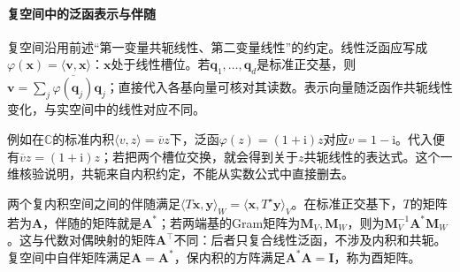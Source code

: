 \paragraph{复空间中的泛函表示与伴随}
复空间沿用前述“第一变量共轭线性、第二变量线性”的约定。线性泛函应写成$\varphi(\bm x)=\langle\bm v,\bm x\rangle$：$\bm x$处于线性槽位。若$\bm q_1,\ldots,\bm q_d$是标准正交基，则$\bm v=\sum_j\overline{\varphi(\bm q_j)}\bm q_j$；直接代入各基向量可核对其读数。表示向量随泛函作共轭线性变化，与实空间中的线性对应不同。

例如在$\mathbb C$的标准内积$\langle v,z\rangle=\overline v z$下，泛函$\varphi(z)=(1+\mathrm i)z$对应$ v=1-\mathrm i$。代入便有$\overline v z=(1+\mathrm i)z$；若把两个槽位交换，就会得到关于$z$共轭线性的表达式。这个一维核验说明，共轭来自内积约定，不能从实数公式中直接删去。

两个复内积空间之间的伴随满足$\langle T\bm x,\bm y\rangle_W=\langle\bm x,T^\star\bm y\rangle_V$。在标准正交基下，$T$的矩阵若为$\bm A$，伴随的矩阵就是$\bm A^*$；若两端基的Gram矩阵为$\bm M_V,\bm M_W$，则为$\bm M_V^{-1}\bm A^*\bm M_W$。这与代数对偶映射的矩阵$\bm A^\top$不同：后者只复合线性泛函，不涉及内积和共轭。复空间中自伴矩阵满足$\bm A=\bm A^*$，保内积的方阵满足$\bm A^*\bm A=\bm I$，称为酉矩阵。
